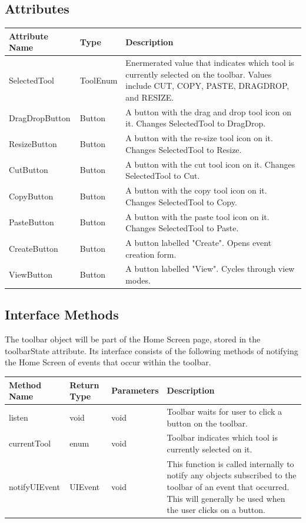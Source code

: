 \documentclass{scrreprt}
\begin{document}
\subsection{Attributes}
\begin{center}
\begin{longtable}{ | p{3cm} | p{3cm} | p{9cm} | }
\hline
\textbf{Attribute Name} & \textbf{Type} & \textbf{Description} \\
\hline
SelectedTool & ToolEnum & Enermerated value that indicates which tool is currently selected on the toolbar. Values include CUT, COPY, PASTE, DRAGDROP, and RESIZE.\\
\hline
DragDropButton & Button & A button with the drag and drop tool icon on it. Changes SelectedTool to DragDrop.\\
\hline
ResizeButton & Button & A button with the re-size tool icon on it. Changes SelectedTool to Resize.\\
\hline
CutButton & Button & A button with the cut tool icon on it. Changes SelectedTool to Cut.\\
\hline
CopyButton & Button & A button with the copy tool icon on it. Changes SelectedTool to Copy.\\
\hline
PasteButton & Button & A button with the paste tool icon on it. Changes SelectedTool to Paste.\\
\hline
CreateButton & Button & A button labelled "Create". Opens event creation form.\\
\hline
ViewButton & Button & A button labelled "View". Cycles through view modes.\\
\hline
\end{longtable}
\end{center}

\subsection{Interface Methods}
\begin{center}
The toolbar object will be part of the Home Screen page, stored in the toolbarState attribute. Its interface consists of the following methods of notifying the Home Screen of events that occur within the toolbar.
\begin{longtable}{ | p{3cm} | p{2cm} | p{2cm} | p{9cm} | }
\hline
\textbf{Method Name} & \textbf{Return Type} & \textbf{Parameters} & \textbf{Description} \\
\hline
listen & void & void & Toolbar waits for user to click a button on the toolbar.\\
\hline
currentTool & enum & void & Toolbar indicates which tool is currently selected on it.\\
\hline
notifyUIEvent & UIEvent & void & This function is called internally to notify any objects subscribed to the toolbar of an event that occurred. This will generally be used when the user clicks on a button.\\
\hline
\end{longtable}
\end{center}
\end{document}
